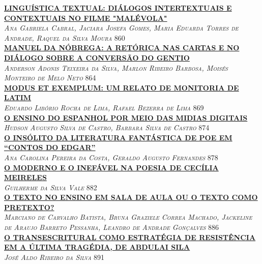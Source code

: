 \noindent \textsc{\hyperlink{trabalhos/251710.pdf.1}{\textbf{LINGUÍSTICA TEXTUAL: DIÁLOGOS INTERTEXTUAIS E CONTEXTUAIS NO FILME "MALÉVOLA"}}}\\ 
\noindent \textsc{\textit{Ana Gabriela Cabral, Jaciara Josefa Gomes, Maria Eduarda Torres de Andrade, Raquel da Silva Moura}} \hfill 860\\ 

\noindent \textsc{\hyperlink{trabalhos/251791.pdf.1}{\textbf{MANUEL DA NÓBREGA: A RETÓRICA NAS CARTAS E NO DIÁLOGO SOBRE A CONVERSÃO DO GENTIO}}}\\ 
\noindent \textsc{\textit{Anderson Adonis Teixeira da Silva, Marlon Ribeiro Barbosa, Moisés Monteiro de Melo Neto}} \hfill 864\\ 

\noindent \textsc{\hyperlink{trabalhos/251572.pdf.1}{\textbf{MODUS ET EXEMPLUM: UM RELATO DE MONITORIA DE LATIM}}}\\ 
\noindent \textsc{\textit{Eduardo Libório Rocha de Lima, Rafael Bezerra de Lima}} \hfill 869\\ 

\noindent \textsc{\hyperlink{trabalhos/251551.pdf.1}{\textbf{O ENSINO DO ESPANHOL POR MEIO DAS MIDIAS DIGITAIS}}}\\ 
\noindent \textsc{\textit{Hudson Augusto Silva de Castro, Barbara Silva de Castro}} \hfill 874\\ 

\noindent \textsc{\hyperlink{trabalhos/251413.pdf.1}{\textbf{O INSÓLITO DA LITERATURA FANTÁSTICA DE POE EM “CONTOS DO EDGAR”}}}\\ 
\noindent \textsc{\textit{Ana Carolina Pereira da Costa, Geraldo Augusto Fernandes}} \hfill 878\\ 

\noindent \textsc{\hyperlink{trabalhos/243741.pdf.1}{\textbf{O MODERNO E O INEFÁVEL NA POESIA DE CECÍLIA MEIRELES}}}\\ 
\noindent \textsc{\textit{Guilherme da Silva Vale}} \hfill 882\\ 

\noindent \textsc{\hyperlink{trabalhos/250291.pdf.1}{\textbf{O TEXTO NO ENSINO EM SALA DE AULA OU O TEXTO COMO PRETEXTO?}}}\\ 
\noindent \textsc{\textit{Marciano de Carvalho Batista, Bruna Graziele Correa Machado, Jackeline de Araujo Barreto Pessanha, Leandro de Andrade Gonçalves}} \hfill 886\\ 

\noindent \textsc{\hyperlink{trabalhos/249672.pdf.1}{\textbf{O TRANSESCRITURAL COMO ESTRATÉGIA DE RESISTÊNCIA EM A ÚLTIMA TRAGÉDIA, DE ABDULAI SILA}}}\\ 
\noindent \textsc{\textit{José Aldo Ribeiro da Silva}} \hfill 891\\ 

